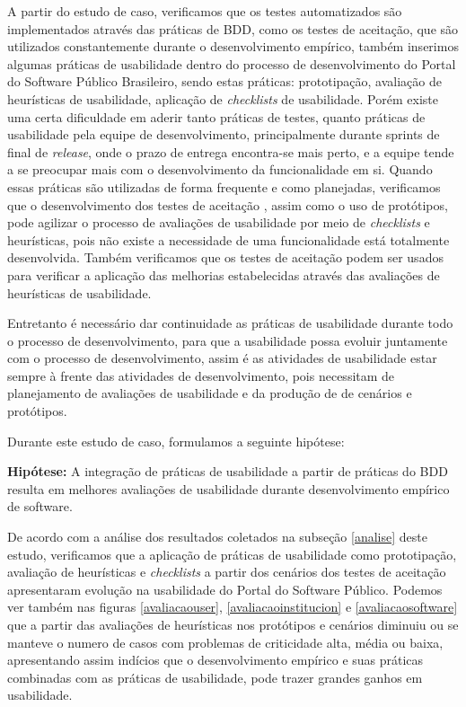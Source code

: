 A partir do estudo de caso, verificamos que os testes automatizados são implementados através das práticas de BDD, como os testes de aceitação, que são utilizados constantemente durante o desenvolvimento empírico, também inserimos algumas práticas de usabilidade dentro do processo de desenvolvimento do Portal do Software Público Brasileiro, sendo estas práticas: prototipação, avaliação de heurísticas de usabilidade, aplicação de \textit{checklists} de usabilidade. Porém existe uma certa dificuldade em aderir tanto práticas de testes, quanto práticas de usabilidade pela equipe de desenvolvimento, principalmente durante sprints de final de \textit{release}, onde o prazo de entrega encontra-se mais perto, e a equipe tende a se preocupar mais com o desenvolvimento  da funcionalidade em si. Quando essas práticas são utilizadas de forma frequente e como planejadas, verificamos que o desenvolvimento dos testes de aceitação , assim como o uso de protótipos, pode agilizar o processo de avaliações de usabilidade por meio de \textit{checklists} e heurísticas, pois não existe a necessidade de uma funcionalidade está totalmente desenvolvida. Também verificamos que os testes de aceitação podem ser usados para verificar a aplicação das melhorias estabelecidas através das avaliações de heurísticas de usabilidade. 

Entretanto é necessário dar continuidade as práticas de usabilidade durante todo o processo de desenvolvimento, para que a usabilidade possa evoluir juntamente com o processo de desenvolvimento, assim é as atividades de usabilidade estar sempre à frente das atividades de desenvolvimento, pois necessitam de planejamento de avaliações de usabilidade e da produção de de cenários e protótipos.


Durante este estudo de caso, formulamos a seguinte hipótese:

\textbf{Hipótese: } A integração de práticas de usabilidade a partir de práticas do BDD resulta em melhores avaliações de usabilidade durante desenvolvimento empírico de software.

De acordo com a análise dos resultados coletados na subseção \ref{analise} deste estudo, verificamos que a aplicação de práticas de usabilidade como prototipação, avaliação de heurísticas e \textit{checklists} a partir dos cenários dos testes de aceitação apresentaram evolução na usabilidade do Portal do Software Público. Podemos ver também nas figuras \ref{avaliacaouser}, \ref{avaliacaoinstitucion} e \ref{avaliacaosoftware} que a partir das avaliações de heurísticas nos protótipos e cenários diminuiu ou se manteve o numero de casos com problemas de criticidade alta, média ou baixa, apresentando assim indícios que o desenvolvimento empírico e suas práticas combinadas com as práticas de usabilidade, pode trazer grandes ganhos em usabilidade.



